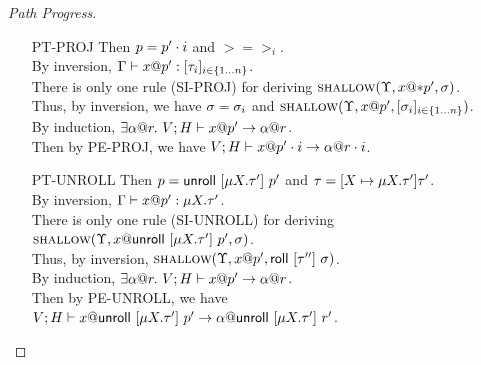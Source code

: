 \begin{proof}[Path Progress]
\begin{itemize}
    \item[PT-PROJ] 
      Then $p = {p'}\cdot{i}$ and $\gt=\gt_i$.\\
      By inversion, ${\Gamma} \vdash {{x}@{p'}} : {[{{\tau}_{i}}]_{{i} \in \{1 \ldots {n}\} }}$.\\
      There is only one rule (\textsc{SI-PROJ}) for 
      deriving $\textsc{shallow}({\Upsilon},{{x}@{*{p'}}},{\sigma})$.\\
      Thus, by inversion, we have $\sigma=\sigma_i$ 
      and $\textsc{shallow}({\Upsilon},{{x}@{p'}},{[{{\sigma}_{i}}]_{{i} \in \{1 \ldots {n}\} }})$.\\
      By induction, $\exists {\alpha}@{r}.~{V;H} \vdash {{x}@{p'}} \to {{\alpha}@{r}}$.\\
      Then by \textsc{PE-PROJ}, we have ${V;H} \vdash {{x}@{{p'}\cdot{i}}} \to {{\alpha}@{{r}\cdot{i}}}$.
    \item[PT-UNROLL] 
      Then $p = \mathsf{unroll}~[{\mu {X}.{\tau'}}]~{p'}$ and $\tau = [{X} \mapsto {\mu {X}.{\tau'}}] {\tau'}$. \\
      By inversion, ${\Gamma} \vdash {{x}@{p'}} : {\mu {X}.{\tau'}}$.\\
      There is only one rule (\textsc{SI-UNROLL}) for 
      deriving $\textsc{shallow}({\Upsilon},{{x}@{\mathsf{unroll}~[{\mu {X}.{\tau'}}]~{p'}}},{\sigma})$.\\
      Thus, by inversion, $\textsc{shallow}({\Upsilon},{{x}@{p'}},{\mathsf{roll}~[{\tau''}]~{\sigma}})$.\\
      By induction, $\exists {\alpha}@{r}.~{V;H} \vdash {{x}@{p'}} \to {{\alpha}@{r}}$.\\
      Then by \textsc{PE-UNROLL}, we have 
      ${V;H} \vdash {{x}@{\mathsf{unroll}~[{\mu {X}.{\tau'}}]~{p'}}} \to {{\alpha}@{\mathsf{unroll}~[{\mu {X}.{\tau'}}]~{r'}}}$.
  \end{itemize}
\end{proof}
